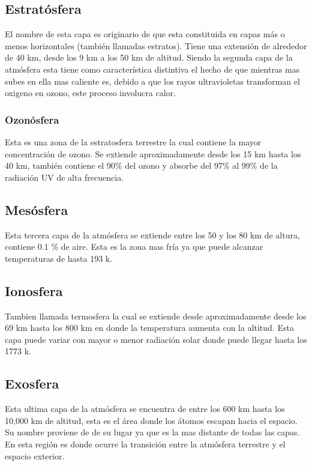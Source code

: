 \documentclass{article} %
\begin{document}
\subsection{Estratósfera} %
El nombre de esta capa es originario de que esta constituida en capas más o menos horizontales (también llamadas estratos). Tiene una extensión de alrededor de 40 km, desde los 9 km a los 50 km de altitud. Siendo la segunda capa de la atmósfera esta tiene como característica distintiva el hecho de que mientras mas subes en ella mas caliente es, debido a que los rayos ultravioletas transforman el oxigeno en ozono, este proceso involucra calor.
\subsubsection{Ozonósfera}
Esta es una zona de la estratosfera terrestre la cual contiene la mayor concentración de ozono. Se extiende aproximadamente desde los 15 km hasta los 40 km, también contiene el 90\% del ozono y absorbe del 97\% al 99\% de la radiación UV de alta frecuencia.
\subsection{Mesósfera}
Esta tercera capa de la atmósfera se extiende entre los 50 y los 80 km de altura, contiene 0.1 \% de aire. Esta es la zona mas fría ya que puede alcanzar temperaturas de hasta 193 k.
\subsection{Ionosfera}
Tambien llamada termosfera la cual se extiende desde aproximadamente desde los 69 km hasta los 800 km en donde la temperatura aumenta con la altitud. Esta capa puede variar con mayor o menor radiación solar donde puede llegar hasta los 1773 k.
\subsection{Exosfera}
Esta ultima capa de la atmósfera se encuentra de entre los 600 km hasta los 10,000 km de altitud, esta es el área donde los átomos escapan hacia el espacio. Su nombre proviene de de su lugar ya que es la mas distante de todas las capas. En esta región es donde ocurre la transición entre la atmósfera terrestre y el espacio exterior.
\end{document}
